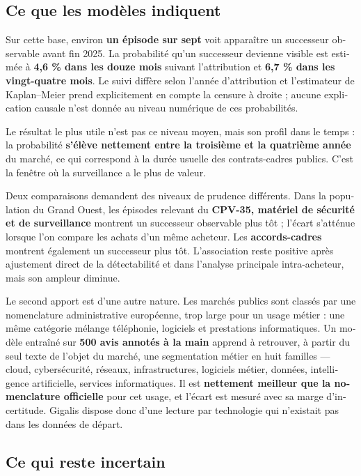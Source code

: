 \begin{otherlanguage}{french}
\subsection*{Ce que les modèles indiquent}

Sur cette base, environ \textbf{un épisode sur sept} voit apparaître un successeur observable avant fin 2025. La probabilité qu'un successeur devienne visible est estimée à \textbf{4,6 \% dans les douze mois} suivant l'attribution et \textbf{6,7 \% dans les vingt-quatre mois}. Le suivi diffère selon l'année d'attribution et l'estimateur de Kaplan--Meier prend explicitement en compte la censure à droite ; aucune explication causale n'est donnée au niveau numérique de ces probabilités.

Le résultat le plus utile n'est pas ce niveau moyen, mais son profil dans le temps : la probabilité \textbf{s'élève nettement entre la troisième et la quatrième année} du marché, ce qui correspond à la durée usuelle des contrats-cadres publics. C'est la fenêtre où la surveillance a le plus de valeur.

Deux comparaisons demandent des niveaux de prudence différents. Dans la population du Grand Ouest, les épisodes relevant du \textbf{CPV-35, matériel de sécurité et de surveillance} montrent un successeur observable plus tôt ; l'écart s'atténue lorsque l'on compare les achats d'un même acheteur. Les \textbf{accords-cadres} montrent également un successeur plus tôt. L'association reste positive après ajustement direct de la détectabilité et dans l'analyse principale intra-acheteur, mais son ampleur diminue.

Le second apport est d'une autre nature. Les marchés publics sont classés par une nomenclature administrative européenne, trop large pour un usage métier : une même catégorie mélange téléphonie, logiciels et prestations informatiques. Un modèle entraîné sur \textbf{500 avis annotés à la main} apprend à retrouver, à partir du seul texte de l'objet du marché, une segmentation métier en huit familles --- cloud, cybersécurité, réseaux, infrastructures, logiciels métier, données, intelligence artificielle, services informatiques. Il est \textbf{nettement meilleur que la nomenclature officielle} pour cet usage, et l'écart est mesuré avec sa marge d'incertitude. Gigalis dispose donc d'une lecture par technologie qui n'existait pas dans les données de départ.

\subsection*{Ce qui reste incertain}


\end{otherlanguage}
